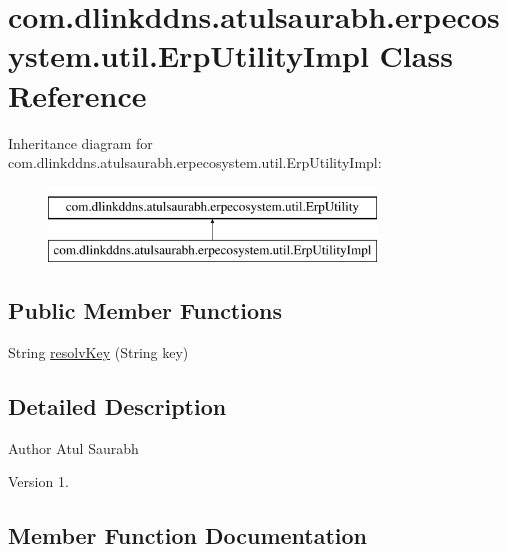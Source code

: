 \hypertarget{classcom_1_1dlinkddns_1_1atulsaurabh_1_1erpecosystem_1_1util_1_1_erp_utility_impl}{}\section{com.\+dlinkddns.\+atulsaurabh.\+erpecosystem.\+util.\+Erp\+Utility\+Impl Class Reference}
\label{classcom_1_1dlinkddns_1_1atulsaurabh_1_1erpecosystem_1_1util_1_1_erp_utility_impl}
Inheritance diagram for com.\+dlinkddns.\+atulsaurabh.\+erpecosystem.\+util.\+Erp\+Utility\+Impl\+:\begin{figure}[H]
\begin{center}
\leavevmode
\includegraphics[height=2.000000cm]{classcom_1_1dlinkddns_1_1atulsaurabh_1_1erpecosystem_1_1util_1_1_erp_utility_impl}
\end{center}
\end{figure}
\subsection*{Public Member Functions}
\begin{DoxyCompactItemize}
\item 
String \mbox{\hyperlink{classcom_1_1dlinkddns_1_1atulsaurabh_1_1erpecosystem_1_1util_1_1_erp_utility_impl_af2cfed2c5aca189be0e160b0610f2644}{resolv\+Key}} (String key)
\end{DoxyCompactItemize}


\subsection{Detailed Description}
\begin{DoxyAuthor}{Author}
Atul Saurabh 
\end{DoxyAuthor}
\begin{DoxyVersion}{Version}
1. 
\end{DoxyVersion}


\subsection{Member Function Documentation}
\mbox{\label{classcom_1_1dlinkddns_1_1atulsaurabh_1_1erpecosystem_1_1util_1_1_erp_utility_impl_af2cfed2c5aca189be0e160b0610f2644}} 
